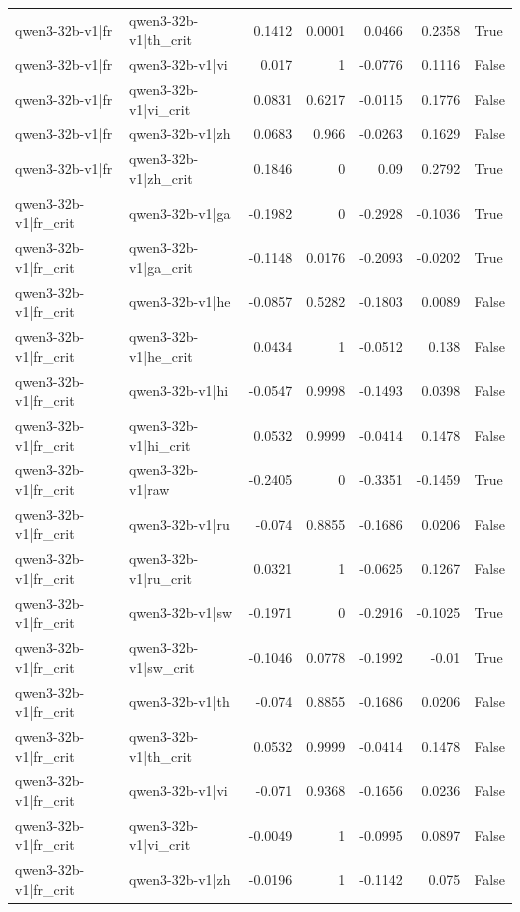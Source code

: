 \begin{table}
\begin{tabular}{l l r r r r l}
qwen3-32b-v1|fr & qwen3-32b-v1|th_crit & 0.1412 & 0.0001 & 0.0466 & 0.2358 & True \\
qwen3-32b-v1|fr & qwen3-32b-v1|vi & 0.017 & 1 & -0.0776 & 0.1116 & False \\
qwen3-32b-v1|fr & qwen3-32b-v1|vi_crit & 0.0831 & 0.6217 & -0.0115 & 0.1776 & False \\
qwen3-32b-v1|fr & qwen3-32b-v1|zh & 0.0683 & 0.966 & -0.0263 & 0.1629 & False \\
qwen3-32b-v1|fr & qwen3-32b-v1|zh_crit & 0.1846 & 0 & 0.09 & 0.2792 & True \\
qwen3-32b-v1|fr_crit & qwen3-32b-v1|ga & -0.1982 & 0 & -0.2928 & -0.1036 & True \\
qwen3-32b-v1|fr_crit & qwen3-32b-v1|ga_crit & -0.1148 & 0.0176 & -0.2093 & -0.0202 & True \\
qwen3-32b-v1|fr_crit & qwen3-32b-v1|he & -0.0857 & 0.5282 & -0.1803 & 0.0089 & False \\
qwen3-32b-v1|fr_crit & qwen3-32b-v1|he_crit & 0.0434 & 1 & -0.0512 & 0.138 & False \\
qwen3-32b-v1|fr_crit & qwen3-32b-v1|hi & -0.0547 & 0.9998 & -0.1493 & 0.0398 & False \\
qwen3-32b-v1|fr_crit & qwen3-32b-v1|hi_crit & 0.0532 & 0.9999 & -0.0414 & 0.1478 & False \\
qwen3-32b-v1|fr_crit & qwen3-32b-v1|raw & -0.2405 & 0 & -0.3351 & -0.1459 & True \\
qwen3-32b-v1|fr_crit & qwen3-32b-v1|ru & -0.074 & 0.8855 & -0.1686 & 0.0206 & False \\
qwen3-32b-v1|fr_crit & qwen3-32b-v1|ru_crit & 0.0321 & 1 & -0.0625 & 0.1267 & False \\
qwen3-32b-v1|fr_crit & qwen3-32b-v1|sw & -0.1971 & 0 & -0.2916 & -0.1025 & True \\
qwen3-32b-v1|fr_crit & qwen3-32b-v1|sw_crit & -0.1046 & 0.0778 & -0.1992 & -0.01 & True \\
qwen3-32b-v1|fr_crit & qwen3-32b-v1|th & -0.074 & 0.8855 & -0.1686 & 0.0206 & False \\
qwen3-32b-v1|fr_crit & qwen3-32b-v1|th_crit & 0.0532 & 0.9999 & -0.0414 & 0.1478 & False \\
qwen3-32b-v1|fr_crit & qwen3-32b-v1|vi & -0.071 & 0.9368 & -0.1656 & 0.0236 & False \\
qwen3-32b-v1|fr_crit & qwen3-32b-v1|vi_crit & -0.0049 & 1 & -0.0995 & 0.0897 & False \\
qwen3-32b-v1|fr_crit & qwen3-32b-v1|zh & -0.0196 & 1 & -0.1142 & 0.075 & False \\

\end{tabular}
\end{table}
